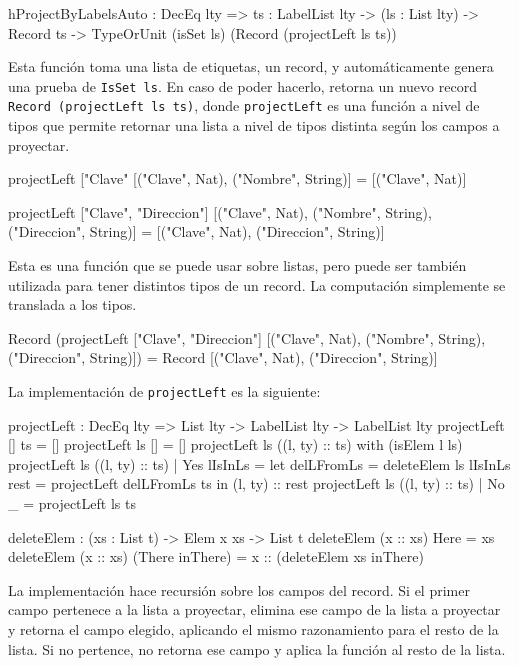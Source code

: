\begin{code}
hProjectByLabelsAuto : DecEq lty => {ts : LabelList lty} ->
  (ls : List lty) -> Record ts ->
  TypeOrUnit (isSet ls) (Record (projectLeft ls ts))
\end{code}

Esta función toma una lista de etiquetas, un record, y automáticamente genera una prueba de \texttt{IsSet ls}. En caso de poder hacerlo, retorna un nuevo record \texttt{Record (projectLeft ls ts)}, donde \texttt{projectLeft} es una función a nivel de tipos que permite retornar una lista a nivel de tipos distinta según los campos a proyectar.

\begin{code}
projectLeft ["Clave"
  [("Clave", Nat), ("Nombre", String)] =
  [("Clave", Nat)]

projectLeft ["Clave", "Direccion"]
  [("Clave", Nat), ("Nombre", String), ("Direccion", String)] =
  [("Clave", Nat), ("Direccion", String)]
\end{code}

Esta es una función que se puede usar sobre listas, pero puede ser también utilizada para tener distintos tipos de un record. La computación simplemente se translada a los tipos.

\begin{code}
Record (projectLeft ["Clave", "Direccion"]
  [("Clave", Nat), ("Nombre", String), ("Direccion", String)]) =
Record [("Clave", Nat), ("Direccion", String)]
\end{code}

La implementación de \texttt{projectLeft} es la siguiente:

\begin{code}
projectLeft : DecEq lty => List lty -> LabelList lty ->
  LabelList lty
projectLeft [] ts = []
projectLeft ls [] = []
projectLeft ls ((l, ty) :: ts) with (isElem l ls)
  projectLeft ls ((l, ty) :: ts) | Yes lIsInLs =
    let delLFromLs = deleteElem ls lIsInLs
      rest = projectLeft delLFromLs ts
    in (l, ty) :: rest
  projectLeft ls ((l, ty) :: ts) | No _ = projectLeft ls ts

deleteElem : (xs : List t) -> Elem x xs -> List t
deleteElem (x :: xs) Here = xs
deleteElem (x :: xs) (There inThere) =
  x :: (deleteElem xs inThere)
\end{code}

La implementación hace recursión sobre los campos del record. Si el primer campo pertenece a la lista a proyectar, elimina ese campo de la lista a proyectar y retorna el campo elegido, aplicando el mismo razonamiento para el resto de la lista. Si no pertence, no retorna ese campo y aplica la función al resto de la lista.

